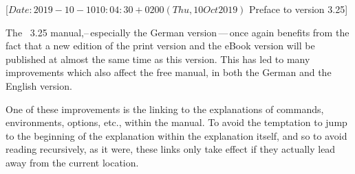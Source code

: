 %
%
%
%
%
%
%
%
%

                 [$Date: 2019-10-10 10:04:30 +0200 (Thu, 10 Oct 2019) $
                  Preface to version 3.25]



The \KOMAScript~3.25 manual,\---\,especially the German version\,---\,once
again benefits from the fact that a new edition of the print version
\cite{book:komascript} and the eBook version \cite{ebook:komascript} will be
published at almost the same time as this version. This has led to many
improvements which also affect the free manual, in both the German and the
English version.

One of these improvements is the linking to the explanations of commands,
environments, options, etc., within the manual. To avoid the temptation to
jump to the beginning of the explanation within the explanation itself, and
so to avoid reading recursively, as it were, these links only take effect
if they actually lead away from the current location.

